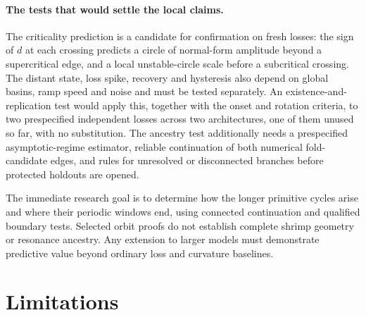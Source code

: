 \documentclass[11pt,letterpaper]{article}
\begin{document}
\paragraph{The tests that would settle the local claims.} The criticality prediction is a candidate for confirmation on fresh
losses: the sign of $d$ at each crossing predicts a circle of normal-form amplitude beyond a supercritical edge, and
a local unstable-circle scale before a subcritical crossing. The distant state, loss spike, recovery and
hysteresis also depend on global basins, ramp speed and noise and must be tested separately. An existence-and-replication test
would apply this, together with the onset and rotation criteria, to two prespecified independent losses across two
architectures, one of them unused so far, with no substitution. The ancestry test additionally needs a prespecified asymptotic-regime estimator, reliable continuation of
both numerical fold-candidate edges, and rules for unresolved or disconnected branches before protected holdouts are opened.

The immediate research goal is to determine how the longer primitive cycles arise and where their periodic
windows end, using connected continuation and qualified boundary tests. Selected orbit proofs do not establish
complete shrimp geometry or resonance ancestry. Any extension to larger models must demonstrate predictive
value beyond ordinary loss and curvature baselines.

\section{Limitations}
\label{sec:limits}
\end{document}
